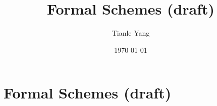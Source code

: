 \documentclass{noteformyself}
\title{Formal Schemes (draft)}
\author{Tianle Yang}
\date{\today}
\begin{document}
    \maketitle

    \section{Formal Schemes (draft)}



\end{document}
